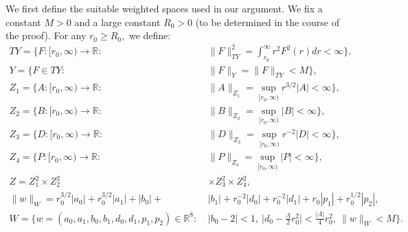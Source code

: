 \documentclass[11pt]{article}
\numberwithin{equation}{section}
\begin{document}
We first define the suitable weighted spaces used in our argument. We fix a constant $M>0$ and a large constant $R_0>0$ (to be determined in the course of the proof). For any $r_0\geq R_0,$ we define:
\begin{align*}
    TY=\bigg\{F:[r_0,\infty)\rightarrow\mathbb{R}:\ &\|F\|_{TY}^2=\int_{r_0}^{\infty}r^2F^2(r)dr<\infty\bigg\},\\
    Y=\bigg\{F\in TY:\ &\|F\|_Y=\|F\|_{TY}<M\bigg\},\\
    Z_1=\bigg\{A:[r_0,\infty)\rightarrow\mathbb{R}:\ &\|A\|_{Z_1}=\sup_{[r_0,\infty)}r^{3/2}|A|<\infty\bigg\},\\
    Z_2=\bigg\{B:[r_0,\infty)\rightarrow\mathbb{R}:\ &\|B\|_{Z_2}=\sup_{[r_0,\infty)}|B|<\infty\bigg\},\\
    Z_3=\bigg\{D:[r_0,\infty)\rightarrow\mathbb{R}:\ &\|D\|_{Z_2}=\sup_{[r_0,\infty)}r^{-2}|D|<\infty\bigg\},\\
    Z_4=\bigg\{P:[r_0,\infty)\rightarrow\mathbb{R}:\ &\|P\|_{Z_4}=\sup_{[r_0,\infty)}|P|<\infty\bigg\},\\
    Z=Z_1^2\times Z_2^2&\times Z_3^2\times Z_4^2,\\
    \|w\|_W=r_0^{3/2}|a_0|+r_0^{3/2}|a_1|+|b_0|+&|b_1|+r_0^{-2}|d_0|+r_0^{-2}|d_1|+r_0|p_1|+r_0^{1/2}|p_2|,\\
    W=\bigg\{w=(a_0,a_1,b_0,b_1,d_0,d_1,p_1,p_2)\in\mathbb{R}^8:\ &|b_0-2|<1,\ \bigg|d_0-\frac{\Lambda}{2}r_0^2\bigg|<\frac{|\Lambda|}{4}r_0^2,\ \|w\|_W<M\bigg\}.
\end{align*}
\end{document}
